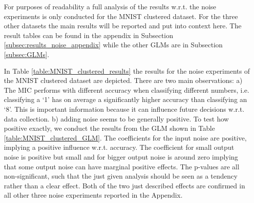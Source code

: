 \documentclass{article}
\begin{document}
For purposes of readability a full analysis of the results w.r.t. the noise experiments is only conducted for the MNIST clustered dataset. For the three other datasets the main results will be reported and put into context here. The result tables can be found in the appendix in Subsection \ref{subsec:results_noise_appendix} while the other GLMs are in Subsection \ref{subsec:GLMs}. 
\par
In Table \ref{table:MNIST_clustered_results} the results for the noise experiments of the MNIST clustered dataset are depicted. There are two main observations: a) The MIC performs with different accuracy when classifying different numbers, i.e. classifying a `1' has on average a significantly higher accuracy than classifying an `8'. This is important information because it can influence future decisions w.r.t. data collection. b) adding noise seems to be generally positive. To test how positive exactly, we conduct the results from the GLM shown in Table \ref{table:MNIST_clustered_GLM}. The coefficients for the input noise are positive, implying a positive influence w.r.t. accuracy. The coefficient for small output noise is positive but small and for bigger output noise is around zero implying that some output noise can have marginal positive effects. The p-values are all non-significant, such that the just given analysis should be seen as a tendency rather than a clear effect. Both of the two just described effects are confirmed in all other three noise experiments reported in the Appendix.
\end{document}
